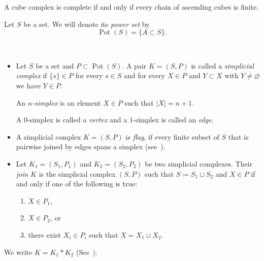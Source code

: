 

\begin{thm}
  A cube complex is complete if and only if every chain of ascending cubes is finite.
\end{thm}

\begin{notation}
  Let \(S\) be a set. We will denote its \emph{power set} by
  \[
    \operatorname{Pot}(S) = \{A \subset S\}.
  \]
\end{notation}

\begin{defin}~\vspace{-6pt}
  \label{defin:flag}
  \begin{itemize}
  \item
    Let \(S\) be a set and \(P \subset \operatorname{Pot}(S)\). A pair \(K = (S, P)\) is called a \emph{simplicial complex} if \(\{s\} \in P\) for every \(s \in S\) and for every \(X \in P\) and \(Y \subset X\) with \(Y \neq \varnothing\) we have \(Y \in P\).

    An \emph{\(n\)-simplex} is an element \(X \in P\) such that \(|X| = n+1\).

    A \(0\)-simplex is called a \emph{vertex} and a \(1\)-simplex is called an \emph{edge}.
  \item
    A simplicial complex \(K = (S,P)\) is \emph{flag}, if every finite subset of \(S\) that is pairwise joined by edges spans a simplex (see\ \cite[Definition II.5.15]{MR1744486}).
  \item Let \(K_1 = (S_1, P_1)\) and \(K_2 = (S_2, P_2)\) be two simplicial complexes. Their \emph{join} \(K\) is the simplicial complex \((S,P)\) such that \(S \coloneqq S_1 \sqcup S_2\) and \(X \in P\) if and only if one of the following is true:
    \begin{enumerate}
    \item \(X \in P_1\),
    \item \(X \in P_2\), or
    \item there exist \(X_i \in P_i\) such that \(X = X_1 \sqcup X_2\).
    \end{enumerate}
  \end{itemize}
  We write \(K = K_1 \ast K_2\) (See\ \cite[Definition~I.7A.2]{MR1744486}).
\end{defin}

